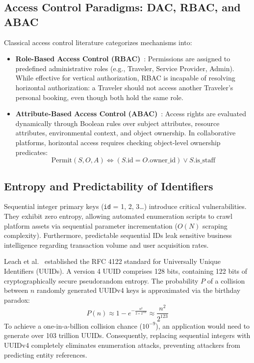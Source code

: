 \documentclass[10pt,twocolumn,a4paper]{article}
\begin{document}
\subsection{Access Control Paradigms: DAC, RBAC, and ABAC}
Classical access control literature categorizes mechanisms into:
\begin{itemize}[leftmargin=*]
    \item \textbf{Role-Based Access Control (RBAC)}~\cite{sandhu1996role}: Permissions are assigned to predefined administrative roles (e.g., Traveler, Service Provider, Admin). While effective for vertical authorization, RBAC is incapable of resolving horizontal authorization: a Traveler should not access another Traveler's personal booking, even though both hold the same role.
    \item \textbf{Attribute-Based Access Control (ABAC)}~\cite{hu2014guide}: Access rights are evaluated dynamically through Boolean rules over subject attributes, resource attributes, environmental context, and object ownership. In collaborative platforms, horizontal access requires checking object-level ownership predicates:
    \begin{equation}
    \text{Permit}(S, O, A) \iff (S.\text{id} = O.\text{owner\_id}) \lor S.\text{is\_staff}
    \end{equation}
\end{itemize}

\subsection{Entropy and Predictability of Identifiers}
Sequential integer primary keys (\texttt{id} = 1, 2, 3\dots) introduce critical vulnerabilities. They exhibit zero entropy, allowing automated enumeration scripts to crawl platform assets via sequential parameter incrementation ($O(N)$ scraping complexity). Furthermore, predictable sequential IDs leak sensitive business intelligence regarding transaction volume and user acquisition rates.

Leach et al.~\cite{leach2005uuid} established the RFC 4122 standard for Universally Unique Identifiers (UUIDs). A version 4 UUID comprises 128 bits, containing 122 bits of cryptographically secure pseudorandom entropy. The probability $P$ of a collision between $n$ randomly generated UUIDv4 keys is approximated via the birthday paradox:
\begin{equation}
P(n) \approx 1 - e^{-\frac{n^2}{2 \times 2^{122}}} \approx \frac{n^2}{2^{123}}
\end{equation}
To achieve a one-in-a-billion collision chance ($10^{-9}$), an application would need to generate over 103 trillion UUIDs. Consequently, replacing sequential integers with UUIDv4 completely eliminates enumeration attacks, preventing attackers from predicting entity references.
\end{document}
